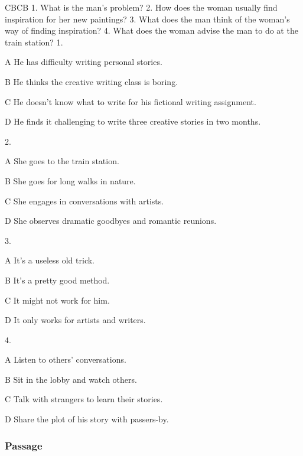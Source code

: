 \begin{enumerate}
	CBCB
	1. What is the man's problem?
	2. How does the woman usually find inspiration for her new paintings?
	3. What does the man think of the woman's way of finding inspiration?
	4. What does the woman advise the man to do at the train station?
	1.
	
	A
	He has difficulty writing personal stories.
	
	B
	He thinks the creative writing class is boring.
	
	C
	He doesn't know what to write for his fictional writing assignment.
	
	D
	He finds it challenging to write three creative stories in two months.
	
	2.
	
	A
	She goes to the train station.
	
	B
	She goes for long walks in nature.
	
	C
	She engages in conversations with artists.
	
	D
	She observes dramatic goodbyes and romantic reunions.
	
	3.
	
	A
	It's a useless old trick.
	
	B
	It's a pretty good method.
	
	C
	It might not work for him.
	
	D
	It only works for artists and writers.
	
	4.
	
	A
	Listen to others' conversations.
	
	B
	Sit in the lobby and watch others.
	
	C
	Talk with strangers to learn their stories.
	
	D
	Share the plot of his story with passers-by.
\end{enumerate}


\subsubsection{Passage}

